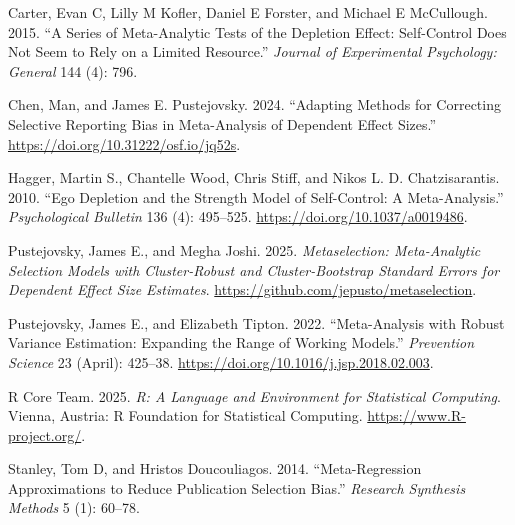 \documentclass[
]{article}
\newlength{\cslhangindent}
\newenvironment{CSLReferences}[2] %
 {\begin{list}{}{%
  \setlength{\itemindent}{0pt}
  \setlength{\leftmargin}{0pt}
  \setlength{\parsep}{0pt}
  \ifodd #1
   \setlength{\leftmargin}{\cslhangindent}
   \setlength{\itemindent}{-1\cslhangindent}
  \fi
  \setlength{\itemsep}{#2\baselineskip}}}
 {\end{list}}
\begin{document}
\protect{}\label{refs}
\begin{CSLReferences}{1}{0}
Carter, Evan C, Lilly M Kofler, Daniel E Forster, and Michael E
McCullough. 2015. {``A Series of Meta-Analytic Tests of the Depletion
Effect: Self-Control Does Not Seem to Rely on a Limited Resource.''}
\emph{Journal of Experimental Psychology: General} 144 (4): 796.

Chen, Man, and James E. Pustejovsky. 2024. {``Adapting Methods for
Correcting Selective Reporting Bias in Meta-Analysis of Dependent Effect
Sizes.''} \url{https://doi.org/10.31222/osf.io/jq52s}.

Hagger, Martin S., Chantelle Wood, Chris Stiff, and Nikos L. D.
Chatzisarantis. 2010. {``Ego Depletion and the Strength Model of
Self-Control: {A} Meta-Analysis.''} \emph{Psychological Bulletin} 136
(4): 495--525. \url{https://doi.org/10.1037/a0019486}.

Pustejovsky, James E., and Megha Joshi. 2025. \emph{Metaselection:
Meta-Analytic Selection Models with Cluster-Robust and Cluster-Bootstrap
Standard Errors for Dependent Effect Size Estimates}.
\url{https://github.com/jepusto/metaselection}.

Pustejovsky, James E., and Elizabeth Tipton. 2022. {``Meta-Analysis with
Robust Variance Estimation: {Expanding} the Range of Working Models.''}
\emph{Prevention Science} 23 (April): 425--38.
\url{https://doi.org/10.1016/j.jsp.2018.02.003}.

R Core Team. 2025. \emph{R: A Language and Environment for Statistical
Computing}. Vienna, Austria: R Foundation for Statistical Computing.
\url{https://www.R-project.org/}.

Stanley, Tom D, and Hristos Doucouliagos. 2014. {``Meta-Regression
Approximations to Reduce Publication Selection Bias.''} \emph{Research
Synthesis Methods} 5 (1): 60--78.

\end{CSLReferences}
\end{document}
